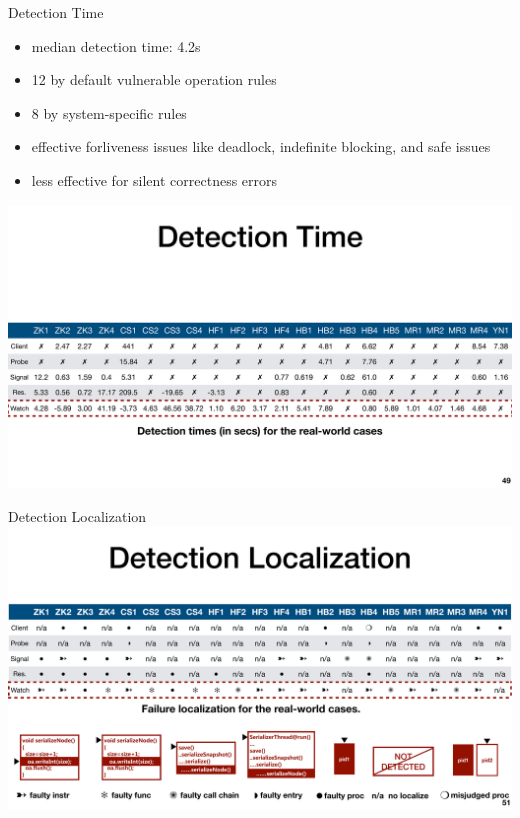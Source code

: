 \documentclass[aspectratio=169]{beamer}
\begin{document}
\begin{frame}{Detection Time}
    \begin{itemize}
        \item median detection time: 4.2s
        \item 12 by default vulnerable operation rules
        \item 8  by system-specific rules
        \item effective forliveness issues like deadlock, indefinite blocking, and safe issues
        \item less effective for silent correctness errors
    \end{itemize}
    \begin{center}
        \includegraphics[width=1\textwidth]{fig/time}
    \end{center}
\end{frame}

\begin{frame}{Detection Localization}
    \includegraphics[width=\textwidth]{fig/localization}
\end{frame}
\end{document}
